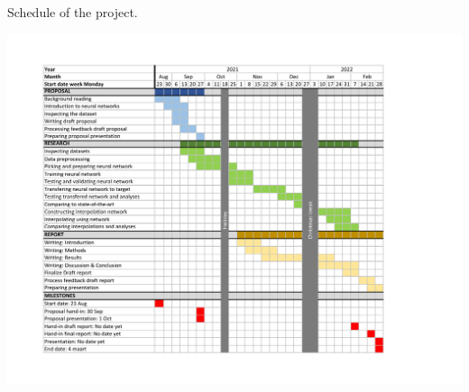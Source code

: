 \documentclass[twocolumn, 10pt, a4paper]{article}
\begin{document}
	
	\begin{table}[t]
		\caption{Schedule of the project.}
		\label{tab:schedule}
		\includegraphics[width=2.1\columnwidth, clip=true]{images/Proposal Schedule.pdf}
	\end{table}
	
	
	
	
	
	
	
	
	
	
	
	
	
\end{document}
